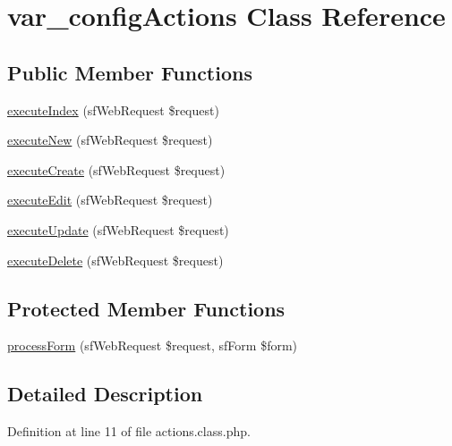 \hypertarget{classvar__config_actions}{\section{var\-\_\-config\-Actions Class Reference}
\label{classvar__config_actions}
}
\subsection*{Public Member Functions}
\begin{DoxyCompactItemize}
\item 
\hyperlink{classvar__config_actions_a948cc911eb1d9f77990be54af3b2080f}{execute\-Index} (sf\-Web\-Request \$request)
\item 
\hyperlink{classvar__config_actions_a0ffbea56560c6c633dae68ec22aff21c}{execute\-New} (sf\-Web\-Request \$request)
\item 
\hyperlink{classvar__config_actions_a75837617743fb64dca82d8133b2c662a}{execute\-Create} (sf\-Web\-Request \$request)
\item 
\hyperlink{classvar__config_actions_af4d8fedd4b28f3398826a1bb8fa54394}{execute\-Edit} (sf\-Web\-Request \$request)
\item 
\hyperlink{classvar__config_actions_af7b4f51862add3c2ebb54efc136a0840}{execute\-Update} (sf\-Web\-Request \$request)
\item 
\hyperlink{classvar__config_actions_a52b5b11b11a0070dd2662257520c045a}{execute\-Delete} (sf\-Web\-Request \$request)
\end{DoxyCompactItemize}
\subsection*{Protected Member Functions}
\begin{DoxyCompactItemize}
\item 
\hyperlink{classvar__config_actions_a7cf661d837626e0320753cbffa019a01}{process\-Form} (sf\-Web\-Request \$request, sf\-Form \$form)
\end{DoxyCompactItemize}


\subsection{Detailed Description}


Definition at line 11 of file actions.\-class.\-php.



